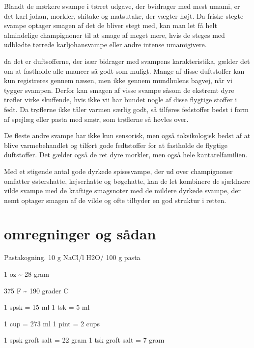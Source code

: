 \documentclass[
]{book}
\begin{document}
Blandt de mørkere svampe i tørret udgave, der bvidrager med mest umami, er det
karl johan, morkler, shitake og matsutake, der vægter højt. Da friske stegte
svampe optager smagen af det de bliver stegt med, kan man let få helt almindelige
champignoner til at smage af meget mere, hvis de steges med udblødte tørrede
karljohansvampe eller andre intense umamigivere.

da det er duftsofferne, der især bidrager med svampens karakteristika, gælder
det om at fastholde alle nuancer så godt som muligt. Mange af disse duftstoffer
kan kun registreres gennem næsen, men ikke gennem mundhulens bagvej, når vi
tygger svampen. Derfor kan smagen af visse svampe såsom de ekstremt dyre trøfler
virke skuffende, hvis ikke vii har bundet nogle af disse flygtige stoffer i fedt.
Da trøflerne ikke tåler varmen særlig godt, så tilføres fedstoffer bedst i form
af spejlæg eller pasta med smør, som trøflerne så høvles over.

De fleste andre svampe har ikke kun sensorisk, men også toksikologisk bedst af at
blive varmebehandlet og tilført gode fedtstoffer for at fastholde de flygtige
duftstoffer. Det gælder også de ret dyre morkler, men også hele kantarelfamilien.

Med et stigende antal gode dyrkede spisesvampe, der ud over champignoner omfatter
østershatte, kejserhatte og bøgehatte, kan de let kombinere de sjældnere
vilde svampe med de kraftige smagsnoter med de mildere dyrkede svampe, der
nemt optager smagen af de vilde og ofte tilbyder en god struktur i retten.

\hypertarget{omregninger-og-suxe5dan}{%
\chapter{omregninger og sådan}\label{omregninger-og-suxe5dan}}

Pastakogning. 10 g NaCl/l H2O/ 100 g pasta

1 oz \textasciitilde{} 28 gram

375 F \textasciitilde{} 190 grader C

1 spsk = 15 ml
1 tsk = 5 ml

1 cup = 273 ml
1 pint = 2 cups

1 spsk groft salt = 22 gram
1 tsk groft salt = 7 gram
\end{document}
